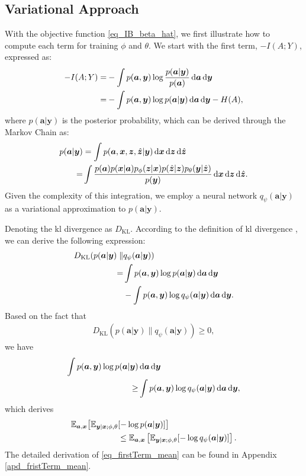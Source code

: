 \subsection{Variational Approach}
\label{subsec:VIB}
With the objective function \cref{eq_IB_beta_hat}, we first illustrate how to compute each term for training \(\phi\) and \(\theta\). We start with the first term, $-I(A;Y)$, expressed as:
\begin{align}
    -I(A;Y)=& -\int p(\bm{a},\bm{y})\log{\frac{p(\bm{a}|\bm{y})}{p(\bm{a})}} \mathop{}\!\mathrm{d} \bm{a} \mathop{}\!\mathrm{d} \bm{y} \notag\\
    =& -\int p(\bm{a},\bm{y})\log{p(\bm{a}|\bm{y})} \mathop{}\!\mathrm{d} \bm{a} \mathop{}\!\mathrm{d} \bm{y} - H(A),
\end{align}
where $p(\bm{a}|\bm{y})$ is the posterior probability, which can be derived through the Markov Chain \cite{Alemi_2017_DVI, Shao_2022_LTO} as:
\begin{align}
    p(\bm{a}|\bm{y}) &= \int p(\bm{a},\bm{x},\bm{z},\hat{\bm{z}}|\bm{y})\mathop{}\!\mathrm{d}{\bm{x}}\mathop{}\!\mathrm{d}{\bm{z}}\mathop{}\!\mathrm{d}{\hat{\bm{z}}} \notag\\
    =& \int\frac{p(\bm{a})p(\bm{x}|\bm{a})p_{\phi}(\bm{z}|\bm{x})p(\hat{\bm{z}}|\bm{z})p_{\theta}(\bm{y}|\hat{\bm{z}})}{p(\bm{y})}\mathop{}\!\mathrm{d}{\bm{x}}\mathop{}\!\mathrm{d}{\bm{z}}\mathop{}\!\mathrm{d}{\hat{\bm{z}}}.
\end{align}
Given the complexity of this integration, we employ a neural network $q_{\psi}(\bm{a}|\bm{y})$ as a variational approximation to $p(\bm{a}|\bm{y})$. 

Denoting the \gls{kl} divergence as $D_{\text{KL}}$. According to the definition of \gls{kl} divergence \cite{Cover_1991_EoI}, we can derive the following expression:
\begin{align}
D_{\text{KL}}(p(\bm{a}|\bm{y}) \parallel &q_{\psi}(\bm{a}|\bm{y})) \notag\\
=&\int p(\bm{a},\bm{y})\log p(\bm{a}|\bm{y}) \mathop{}\!\mathrm{d}\bm{a}\mathop{}\!\mathrm{d}\bm{y} \notag\\
&- \int p(\bm{a},\bm{y}) \log q_{\psi}(\bm{a}|\bm{y}) \mathop{}\!\mathrm{d}\bm{a}\mathop{}\!\mathrm{d}\bm{y}.
\end{align}
Based on the fact that 
\begin{align}
    D_{\text{KL}}(p(\bm{a}|\bm{y}) \parallel q_{\psi}(\bm{a}|\bm{y})) \geq 0,
    \label{eq_KL_conditional}
\end{align} 
we have
\begin{align}
\int p(\bm{a},\bm{y})\log p(\bm{a}|\bm{y})& \mathop{}\!\mathrm{d}\bm{a}\mathop{}\!\mathrm{d}\bm{y} \notag\\
\geq &\int p(\bm{a},\bm{y})\log q_{\psi}(\bm{a}|\bm{y}) \mathop{}\!\mathrm{d}\bm{a}\mathop{}\!\mathrm{d}\bm{y},
\label{eq_KL_conditional_2}
\end{align}
which derives
\begin{align}
\mathbb{E}_{\bm{a},\bm{x}}\bigl[\mathbb{E}_{\bm{y}|\bm{x};\phi,\theta}&[-\log p(\bm{a}|\bm{y})]\bigr] \notag\\
&\leq \mathbb{E}_{\bm{a},\bm{x}}\left[\mathbb{E}_{\bm{y}|\bm{x};\phi,\theta}[-\log q_{\psi}(\bm{a}|\bm{y})]\right].
\label{eq_firstTerm_mean}
\end{align}
The detailed derivation of \cref{eq_firstTerm_mean} can be found in Appendix \ref{apd_fristTerm_mean}.

